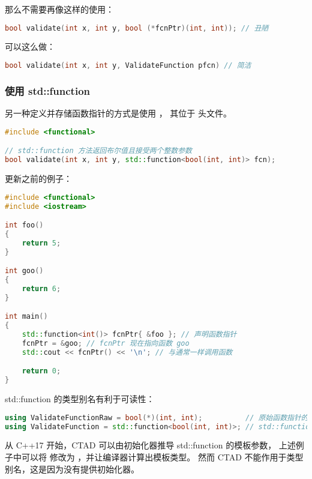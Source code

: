 \documentclass[../../LearnCpp.tex]{subfiles}
\begin{document}
那么不需要再像这样的使用：

\begin{lstlisting}[language=C++]
bool validate(int x, int y, bool (*fcnPtr)(int, int)); // 丑陋
\end{lstlisting}

可以这么做：

\begin{lstlisting}[language=C++]
bool validate(int x, int y, ValidateFunction pfcn) // 简洁
\end{lstlisting}

\subsubsection*{使用 std::function}

另一种定义并存储函数指针的方式是使用 ，
其位于  头文件。

\begin{lstlisting}[language=C++]
#include <functional>

// std::function 方法返回布尔值且接受两个整数参数
bool validate(int x, int y, std::function<bool(int, int)> fcn);
\end{lstlisting}

更新之前的例子：

\begin{lstlisting}[language=C++]
#include <functional>
#include <iostream>

int foo()
{
    return 5;
}

int goo()
{
    return 6;
}

int main()
{
    std::function<int()> fcnPtr{ &foo }; // 声明函数指针
    fcnPtr = &goo; // fcnPtr 现在指向函数 goo
    std::cout << fcnPtr() << '\n'; // 与通常一样调用函数

    return 0;
}
\end{lstlisting}

std::function 的类型别名有利于可读性：

\begin{lstlisting}[language=C++]
using ValidateFunctionRaw = bool(*)(int, int);          // 原始函数指针的别名
using ValidateFunction = std::function<bool(int, int)>; // std::function 的别名
\end{lstlisting}

从 C++17 开始，CTAD 可以由初始化器推导 std::function 的模板参数，
上述例子中可以将 
修改为 ，并让编译器计算出模板类型。
然而 CTAD 不能作用于类型别名，这是因为没有提供初始化器。
\end{document}
